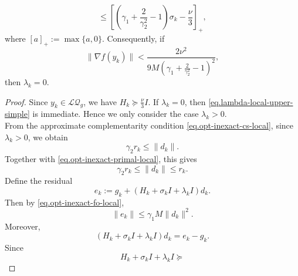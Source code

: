 \begin{itemize}
{\begin{lemma}
\begin{equation}
                      \le
                      \left[
                          \left(
                          \gamma_1+\frac{2}{\gamma_2^2}-1
                          \right)\sigma_k
                          -
                          \frac{\nu}{3}
                          \right]_+,
                  \end{equation}
                  where \([a]_+:=\max\{a,0\}\). Consequently, if
                  \begin{equation}
                      \label{eq.inexact-smaller-lqg-simple}
                      \|\nabla f(y_k)\|
                      <
                      \frac{2\nu^2}{
                          9M
                          \left(
                          \gamma_1+\frac{2}{\gamma_2^2}-1
                          \right)^2
                      },
                  \end{equation}
                  then
                  \(
                  \lambda_k=0.
                  \)
              \end{lemma}
              \begin{proof}
                  Since \(y_k\in\mathcal{LQ}_g\), we have
                  \(
                  H_k\succeq \frac{\nu}{3}I.
                  \)
                  If \(\lambda_k=0\), then \eqref{eq.lambda-local-upper-simple} is immediate.
                  Hence we only consider the case \(\lambda_k>0\).\\
                  From the approximate complementarity condition
                  \eqref{eq.opt-inexact-cs-local}, since \(\lambda_k>0\), we obtain
                  \[
                      \gamma_2 r_k\le \|d_k\|.
                  \]
                  Together with \eqref{eq.opt-inexact-primal-local}, this gives
                  \begin{equation}
                      \label{eq.local-d-range-simple}
                      \gamma_2 r_k\le \|d_k\|\le r_k.
                  \end{equation}
                  Define the residual
                  \[
                      e_k:=g_k+(H_k+\sigma_k I+\lambda_k I)d_k.
                  \]
                  Then by \eqref{eq.opt-inexact-fo-local},
                  \[
                      \|e_k\|\le \gamma_1M\|d_k\|^2.
                  \]
                  Moreover,
                  \[
                      (H_k+\sigma_k I+\lambda_k I)d_k=e_k-g_k.
                  \]
                  Since
                  \[
                      H_k+\sigma_k I+\lambda_k I
                      \succeq
\]
\end{proof}}
\end{itemize}
